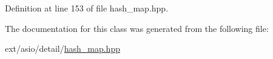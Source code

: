 Definition at line 153 of file hash\+\_\+map.\+hpp.



The documentation for this class was generated from the following file\+:\begin{DoxyCompactItemize}
\item 
ext/asio/detail/\hyperlink{hash__map_8hpp}{hash\+\_\+map.\+hpp}\end{DoxyCompactItemize}
